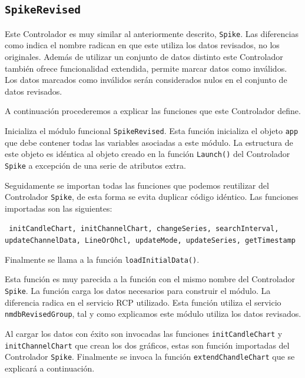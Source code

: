 	\subsection{\texttt{SpikeRevised}}
		Este Controlador es muy similar al anteriormente descrito, \texttt{Spike}. Las diferencias como indica el nombre radican en que este
		utiliza los datos revisados, no los originales. Además de utilizar un conjunto de datos distinto este Controlador también ofrece
		funcionalidad extendida, permite marcar datos como inválidos. Los datos marcados como inválidos serán considerados nulos en el
		conjunto de datos revisados.
		\par
		A continuación procederemos a explicar las funciones que este Controlador define.
		\begin{description}[style=unboxed,leftmargin=0cm]
			\item[\texttt{Launch()}]
				Inicializa el módulo funcional \texttt{SpikeRevised}. Esta función inicializa el objeto \texttt{app} que debe contener
				todas las variables asociadas a este módulo. La estructura de este objeto es idéntica al objeto creado en la función
				\texttt{Launch()} del Controlador \texttt{Spike} a excepción de una serie de atributos extra. 
				\par
				Seguidamente se importan todas las funciones que podemos reutilizar del Controlador \texttt{Spike}, de esta forma
				se evita duplicar código idéntico. Las funciones importadas son las siguientes:
					\begin{center} \texttt{	initCandleChart, initChannelChart, changeSeries, searchInterval, updateChannelData,
					  			LineOrOhcl, updateMode, updateSeries, getTimestamp}
					\end{center}
				Finalmente se llama a la función \texttt{loadInitialData()}.
		    	\item[\texttt{loadInitialData()}]
				Esta función es muy parecida a la función con el mismo nombre del Controlador \texttt{Spike}. La función carga los
				datos necesarios para construir el módulo. La diferencia radica en el servicio RCP utilizado. Esta función utiliza el
				servicio \texttt{nmdbRevisedGroup}, tal y como explicamos este módulo utiliza los datos revisados.
				\par
				Al cargar los datos con éxito son invocadas las funciones \texttt{initCandleChart} y \texttt{initChannelChart} que
				crean los dos gráficos, estas son función importadas del Controlador \texttt{Spike}. Finalmente se invoca la función
				\texttt{extendChandleChart} que se explicará a continuación.

\end{description}
